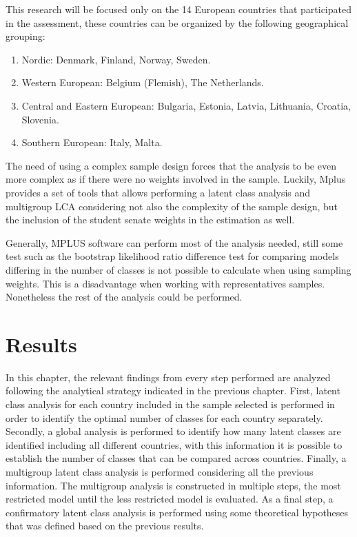 \documentclass[12pt,a4paper,oneside]{reedthesis}
\providecommand{\tightlist}{%
  \setlength{\itemsep}{0pt}\setlength{\parskip}{0pt}}
\begin{document}
This research will be focused only on the 14 European countries that participated in the assessment, these countries can be organized by the following geographical grouping:
\begin{enumerate}
\def\labelenumi{\alph{enumi})}
\tightlist
\item
  Nordic: Denmark, Finland, Norway, Sweden.\\
\item
  Western European: Belgium (Flemish), The Netherlands.\\
\item
  Central and Eastern European: Bulgaria, Estonia, Latvia, Lithuania, Croatia, Slovenia.\\
\item
  Southern European: Italy, Malta.
\end{enumerate}
The need of using a complex sample design forces that the analysis to be even more complex as if there were no weights involved in the sample. Luckily, Mplus provides a set of tools that allows performing a latent class analysis and multigroup LCA considering not also the complexity of the sample design, but the inclusion of the student senate weights in the estimation as well.

Generally, MPLUS software can perform most of the analysis needed, still some test such as the bootstrap likelihood ratio difference test for comparing models differing in the number of classes is not possible to calculate when using sampling weights. This is a disadvantage when working with representatives samples. Nonetheless the rest of the analysis could be performed.

\clearpage

\hypertarget{results}{%
\chapter{Results}\label{results}}

In this chapter, the relevant findings from every step performed are analyzed following the analytical strategy indicated in the previous chapter. First, latent class analysis for each country included in the sample selected is performed in order to identify the optimal number of classes for each country separately. Secondly, a global analysis is performed to identify how many latent classes are identified including all different countries, with this information it is possible to establish the number of classes that can be compared across countries. Finally, a multigroup latent class analysis is performed considering all the previous information. The multigroup analysis is constructed in multiple steps, the most restricted model until the less restricted model is evaluated. As a final step, a confirmatory latent class analysis is performed using some theoretical hypotheses that was defined based on the previous results.
\end{document}
